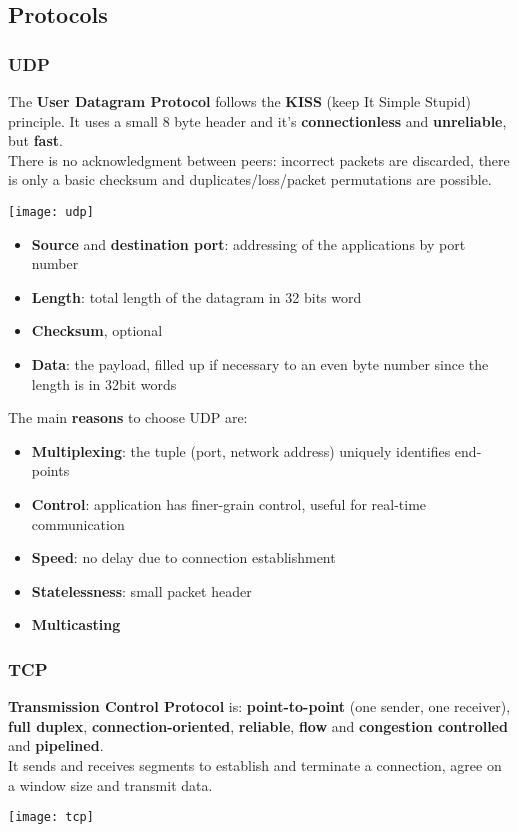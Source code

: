 \subsection{Protocols}
\subsubsection{UDP}
The \textbf{User Datagram Protocol} follows the \textbf{KISS} (keep It Simple Stupid) principle. It uses a small 8 byte header and it's \textbf{connectionless} and \textbf{unreliable}, but \textbf{fast}.\\
There is no acknowledgment between peers: incorrect packets are discarded, there is only a basic checksum and duplicates/loss/packet permutations are possible.

\begin{center}
	\texttt{[image: udp]}
\end{center} 
\begin{itemize}
	\item \textbf{Source} and \textbf{destination port}: addressing of the applications by port number
	\item \textbf{Length}: total length of the datagram in 32 bits word
	\item \textbf{Checksum}, optional
	\item \textbf{Data}: the payload, filled up if necessary to an even byte number since the length is in 32bit words
\end{itemize}
The main \textbf{reasons} to choose UDP are:
\begin{itemize}
	\item \textbf{Multiplexing}: the tuple (port, network address) uniquely identifies end-points
	\item \textbf{Control}: application has finer-grain control, useful for real-time communication
	\item \textbf{Speed}: no delay due to connection establishment
	\item \textbf{Statelessness}: small packet header
	\item \textbf{Multicasting}
\end{itemize}

\subsubsection{TCP}
\textbf{Transmission Control Protocol} is: \textbf{point-to-point} (one sender, one receiver), \textbf{full duplex}, \textbf{connection-oriented}, \textbf{reliable}, \textbf{flow} and \textbf{congestion controlled} and \textbf{pipelined}.\\
It sends and receives segments to establish and terminate a connection, agree on a window size and transmit data.
\begin{center}
	\texttt{[image: tcp]}
\end{center}

